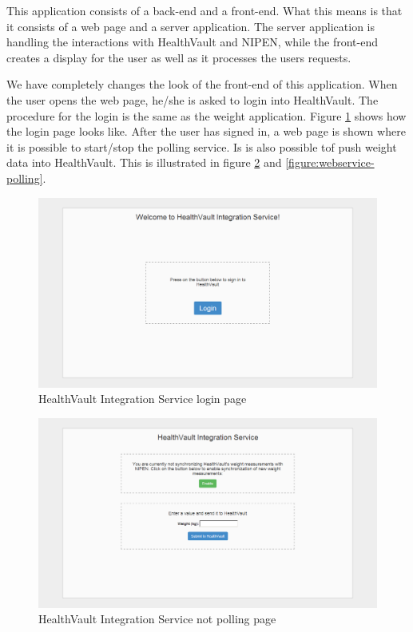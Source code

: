This application consists of a back-end and a front-end.
What this means is that it consists of a web page and a server application.
The server application is handling the interactions with HealthVault and NIPEN, while the front-end creates a display for the user as well as it processes the users requests.

We have completely changes the look of the front-end of this application.
When the user opens the web page, he/she is asked to login into HealthVault.
The procedure for the login is the same as the weight application.
Figure \ref{figure:webservice-login} shows how the login page looks like.
After the user has signed in, a web page is shown where it is possible to start/stop the polling service.
Is is also possible tof push weight data into HealthVault. 
This is illustrated in figure \ref{figure:webservice-not-polling} and \ref{figure:webservice-polling}.

\begin{figure}[H]
\centering
\includegraphics[scale=0.4]{../Figures/webservice-login.png}
\caption{HealthVault Integration Service login page}
\label{figure:webservice-login}
\end{figure}

\begin{figure}[H]
\centering
\includegraphics[scale=0.4]{../Figures/webservice-not-polling.png}
\caption{HealthVault Integration Service not polling page}
\label{figure:webservice-not-polling}
\end{figure}

